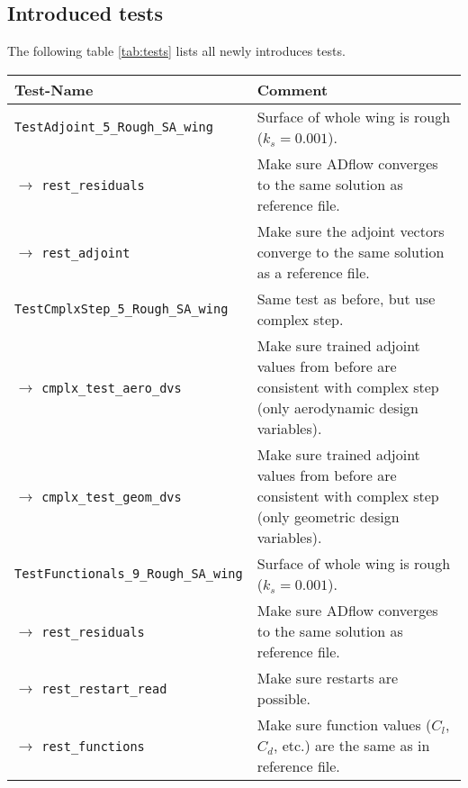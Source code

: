 \subsection{Introduced tests}
The following table \ref{tab:tests} lists all newly introduces tests.

\begingroup
\renewcommand{\arraystretch}{1.5} %
\begin{xltabular}{\textwidth}{lX}
    \toprule
    Test-Name                                     & Comment \\
    \toprule
    \endhead
    \texttt{TestAdjoint\_5\_Rough\_SA\_wing}      & Surface of whole wing is
     rough ($k_{s} = 0.001$).\\

    $\rightarrow$ \texttt{rest\_residuals}        & Make sure ADflow converges to
    the same solution as reference file.\\

    $\rightarrow$ \texttt{rest\_adjoint} & Make sure the adjoint vectors converge
    to the same solution as a reference file.\\

    \midrule

    \texttt{TestCmplxStep\_5\_Rough\_SA\_wing}    & Same test as before, but use
    complex step. \\

    $\rightarrow$ \texttt{cmplx\_test\_aero\_dvs} & Make sure trained adjoint
    values from before are consistent with complex step (only aerodynamic design
    variables).\\

    $\rightarrow$ \texttt{cmplx\_test\_geom\_dvs}& Make sure trained adjoint
    values from before are consistent with complex step (only geometric design
    variables).\\

    \midrule

    \texttt{TestFunctionals\_9\_Rough\_SA\_wing} & Surface of whole wing is
     rough ($k_{s} = 0.001$).\\

    $\rightarrow$ \texttt{rest\_residuals}        & Make sure ADflow converges to
    the same solution as reference file.\\

    $\rightarrow$ \texttt{rest\_restart\_read}    & Make sure restarts are possible.\\

    $\rightarrow$ \texttt{rest\_functions}        & Make sure function values
    ($C_{l}$, $C_{d}$, etc.) are the same as in reference file.\\


\end{xltabular}
